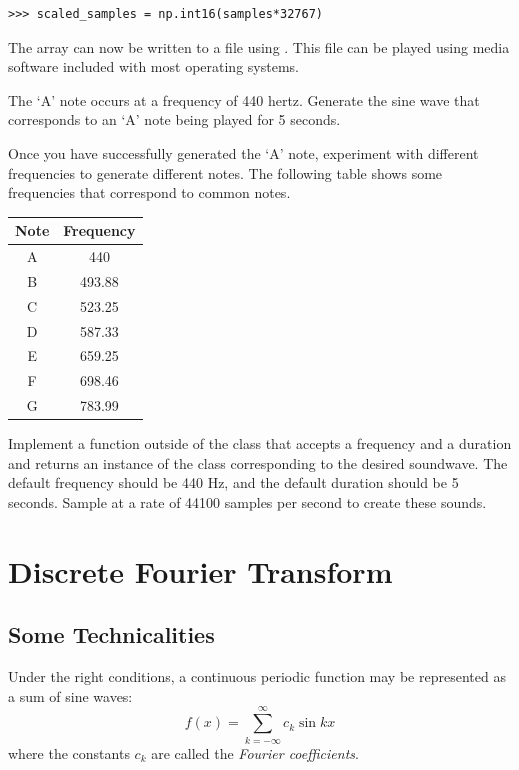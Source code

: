 \begin{lstlisting}
>>> scaled_samples = np.int16(samples*32767)
\end{lstlisting}

The  array can now be written to a file using .
This file can be played using media software included with most operating systems.

\begin{problem}
The `A' note occurs at a frequency of 440 hertz.
Generate the sine wave that corresponds to an `A' note being played for 5 seconds.

Once you have successfully generated the `A' note, experiment with different frequencies to generate different notes.
The following table shows some frequencies that correspond to common notes.

\begin{center}
\begin{tabular}{|c|c|}
\hline
Note & Frequency \\
\hline
A & 440 \\
B & 493.88 \\
C & 523.25 \\
D & 587.33 \\
E & 659.25 \\
F & 698.46 \\
G & 783.99 \\
\hline
\end{tabular}
\end{center}

Implement a function outside of the  class that accepts a frequency and a duration and returns an instance of the  class corresponding to the desired soundwave.
The default frequency should be 440 Hz, and the default duration should be 5 seconds.
Sample at a rate of 44100 samples per second to create these sounds.
\end{problem}

\section*{Discrete Fourier Transform}

\subsection*{Some Technicalities}
Under the right conditions, a continuous periodic function may be represented as a sum of sine waves:
\[
f(x) = \displaystyle{\sum_{k=-\infty}^{\infty}} c_k \sin{kx}
\]
where the constants $c_k$ are called the \emph{Fourier coefficients}.

